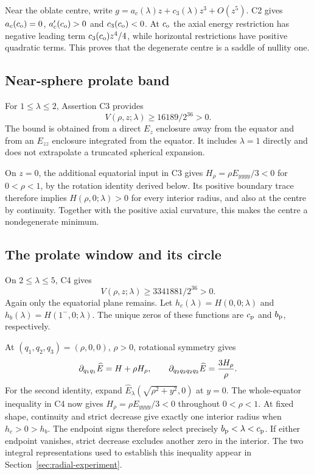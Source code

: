 Near the oblate centre, write $g=a_c(\lambda)z+c_3(\lambda)z^3+O(z^5)$. C2 gives $a_c(c_{\mathrm o})=0$, $a_c'(c_{\mathrm o})>0$ and $c_3(c_{\mathrm o})<0$. At $c_{\mathrm o}$ the axial energy restriction has negative leading term $c_3(c_{\mathrm o})z^4/4$, while horizontal restrictions have positive quadratic terms. This proves that the degenerate centre is a saddle of nullity one.

\subsection{Near-sphere prolate band}
For $1\le\lambda\le2$, Assertion C3 provides
\begin{equation}\label{eq:near_V}
 V(\rho,z;\lambda)\ge16189/2^{36}>0.
\end{equation}
The bound is obtained from a direct $E_z$ enclosure away from the equator and from an $E_{zz}$ enclosure integrated from the equator. It includes $\lambda=1$ directly and does not extrapolate a truncated spherical expansion.

On $z=0$, the additional equatorial input in C3 gives $H_\rho=\rho E_{yyyy}/3<0$ for $0<\rho<1$, by the rotation identity derived below. Its positive boundary trace therefore implies $H(\rho,0;\lambda)>0$ for every interior radius, and also at the centre by continuity. Together with the positive axial curvature, this makes the centre a nondegenerate minimum.

\subsection{The prolate window and its circle}
On $2\le\lambda\le5$, C4 gives
\begin{equation}\label{eq:window_V}
 V(\rho,z;\lambda)\ge3341881/2^{36}>0.
\end{equation}
Again only the equatorial plane remains. Let $h_c(\lambda)=H(0,0;\lambda)$ and $h_b(\lambda)=H(1^-,0;\lambda)$. The unique zeros of these functions are $c_{\mathrm p}$ and $b_{\mathrm p}$, respectively.

At $(q_1,q_2,q_3)=(\rho,0,0)$, $\rho>0$, rotational symmetry gives
\begin{equation}\label{eq:fourth_derivative}
 \partial_{q_1q_1}\widehat E=H+\rho H_\rho,\qquad
 \partial_{q_2q_2q_2q_2}\widehat E=\frac{3H_\rho}{\rho}.
\end{equation}
For the second identity, expand $\widehat E_\lambda(\sqrt{\rho^2+y^2},0)$ at $y=0$. The whole-equator inequality in C4 now gives $H_\rho=\rho E_{yyyy}/3<0$ throughout $0<\rho<1$. At fixed shape, continuity and strict decrease give exactly one interior radius when $h_c>0>h_b$. The endpoint signs therefore select precisely $b_{\mathrm p}<\lambda<c_{\mathrm p}$. If either endpoint vanishes, strict decrease excludes another zero in the interior. The two integral representations used to establish this inequality appear in Section~\ref{sec:radial-experiment}.

